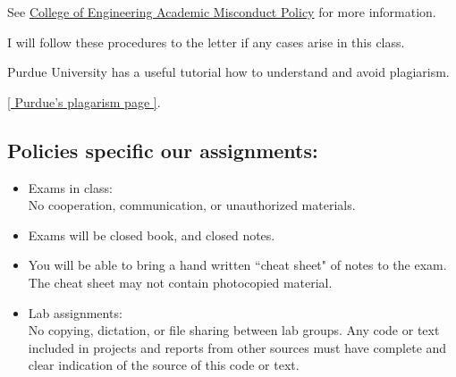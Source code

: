 See \href{https://www.engr.washington.edu/current/policies/academic-integrity-misconduct}
    {College of Engineering Academic Misconduct Policy}
      for more information.

I will follow these procedures to the letter if any cases arise
in this class.

Purdue University has a useful tutorial how to understand and avoid plagiarism.

\href{https://owl.purdue.edu/owl/avoiding_plagiarism/index.html}{[ Purdue's plagarism page ]}.



\subsection{Policies specific our assignments:}
\begin{itemize}
\item Exams in class:\\
      No cooperation, communication, or unauthorized materials.
\item  Exams will be closed book, and closed notes.
\item  You will be able to bring a hand written ``cheat sheet" of notes
to the exam.  The cheat sheet may not contain photocopied material.
\item Lab assignments:\\
      No copying, dictation, or file sharing between lab groups. Any code or
      text included in projects and reports from other sources must have complete
      and clear indication of the source of this code or text.
\end{itemize}


